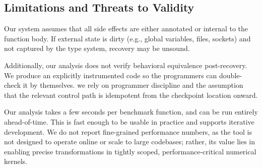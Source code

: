 \subsection{Limitations and Threats to Validity}
\label{sec:threats}

Our system assumes that all side effects are either annotated or internal to the function body. If external state is dirty (e.g., global variables, files, sockets) and not captured by the type system, recovery may be unsound.

Additionally, our analysis does not verify behavioral equivalence post-recovery. We produce an explicitly instrumented code so the programmers can double-check it by themselves. we rely on programmer discipline and the assumption that the relevant control path is idempotent from the checkpoint location onward.

Our analysis takes a few seconds per benchmark function, and can be run entirely ahead-of-time. This is fast enough to be usable in practice and supports iterative development. We do not report fine-grained performance numbers, as the tool is not designed to operate online or scale to large codebases; rather, its value lies in enabling precise transformations in tightly scoped, performance-critical numerical kernels.
